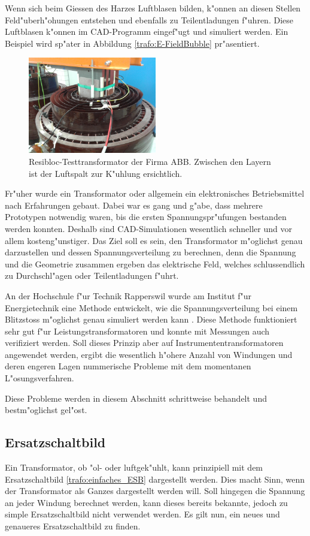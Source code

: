 \begin{refsection}
Wenn sich beim Giessen des Harzes Luftblasen bilden, k"onnen an diesen Stellen Feld"uberh"ohungen entstehen und ebenfalls zu Teilentladungen f"uhren. Diese Luftblasen k"onnen im CAD-Programm eingef"ugt und simuliert werden. Ein Beispiel wird sp"ater in Abbildung \ref{trafo:E-FieldBubble} pr"asentiert.

\begin{figure}
	\centering
	\includegraphics[width=0.5\textwidth]{./trafo/images/resibloc.jpg}
	\caption{Resibloc-Testtransformator der Firma ABB. Zwischen den Layern ist der Luftspalt zur K"uhlung ersichtlich.}
	\label{trafo:resibloc}
\end{figure}
Fr"uher wurde ein Transformator oder allgemein ein elektronisches Betriebsmittel nach Erfahrungen gebaut. Dabei war es gang und g"abe, dass mehrere Prototypen notwendig waren, bis die ersten Spannungspr"ufungen bestanden werden konnten. Deshalb sind CAD-Simulationen wesentlich schneller und vor allem kosteng"unstiger. Das Ziel soll es sein, den Transformator m"oglichst genau darzustellen und dessen Spannungsverteilung zu berechnen, denn die Spannung und die Geometrie zusammen ergeben das elektrische Feld, welches schlussendlich zu Durchschl"agen oder Teilentladungen f"uhrt.

An der Hochschule f"ur Technik Rapperswil wurde am Institut f"ur Energietechnik eine Methode entwickelt, wie die Spannungsverteilung bei einem Blitzstoss m"oglichst genau simuliert werden kann \cite{trafo:BILImpulse}. Diese Methode funktioniert sehr gut f"ur Leistungstransformatoren und konnte mit Messungen auch verifiziert werden. 
%
Soll dieses Prinzip aber auf Instrumententransformatoren angewendet werden, ergibt die wesentlich h"ohere Anzahl von Windungen und deren engeren Lagen nummerische Probleme mit dem momentanen L"osungsverfahren. 

Diese Probleme werden in diesem Abschnitt schrittweise behandelt und bestm"oglichst gel"ost. 


\subsection{Ersatzschaltbild}
%
Ein Transformator, ob "ol- oder luftgek"uhlt, kann prinzipiell mit dem Ersatzschaltbild \ref{trafo:einfaches_ESB} dargestellt werden. Dies macht Sinn, wenn der Transformator als Ganzes dargestellt werden will. Soll hingegen die Spannung an jeder Windung berechnet werden, kann dieses bereits bekannte, jedoch zu simple Ersatzschaltbild nicht verwendet werden. Es gilt nun, ein neues und genaueres Ersatzschaltbild zu finden. 


\end{refsection}
